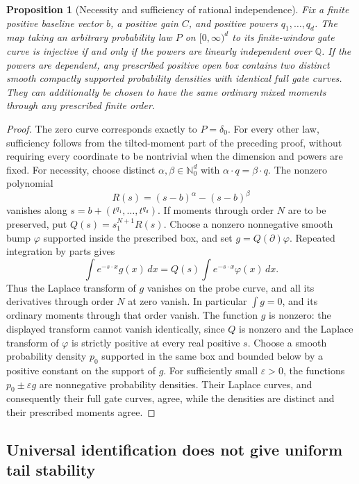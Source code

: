 \documentclass[11pt,letterpaper]{article}
\newtheorem{proposition}[theorem]{Proposition}
\theoremstyle{definition}
\theoremstyle{remark}
\newcommand{\1}{\mathbf 1}
\begin{document}
\begin{proposition}[Necessity and sufficiency of rational independence]
\label{p08:prop:temp-sharp-criterion}
Fix a finite positive baseline vector $b$, a positive gain $C$, and
positive powers $q_1,\ldots,q_d$. The map taking an arbitrary probability
law $P$ on $[0,\infty)^d$ to its finite-window gate curve is injective
if and only if the powers are linearly independent over $\mathbb Q$.
If the powers are dependent, any prescribed positive open box contains
two distinct smooth compactly supported probability densities with
identical full gate curves. They can additionally be chosen to have
the same ordinary mixed moments through any prescribed finite order.
\end{proposition}
\begin{proof}
The zero curve corresponds exactly to $P=\delta_0$. For every other
law, sufficiency follows from the tilted-moment part of the preceding
proof, without requiring every coordinate to be nontrivial when the
dimension and powers are fixed. For necessity, choose distinct
$\alpha,\beta\in\mathbb N_0^d$ with
$\alpha\cdot q=\beta\cdot q$. The nonzero polynomial
\[
            R(s)=(s-b)^\alpha-(s-b)^\beta
\]
vanishes along $s=b+(t^{q_1},\ldots,t^{q_d})$. If moments through
order $N$ are to be preserved, put $Q(s)=s_1^{N+1}R(s)$.
Choose a nonzero nonnegative smooth bump $\varphi$ supported inside
the prescribed box, and set $g=Q(\partial)\varphi$.
Repeated integration by parts gives
\[
          \int e^{-s\cdot x}g(x)\,dx
                 =Q(s)\int e^{-s\cdot x}\varphi(x)\,dx.
\]
Thus the Laplace transform of $g$ vanishes on the probe curve, and
all its derivatives through order $N$ at zero vanish. In particular
$\int g=0$, and its ordinary moments through that order vanish.
The function $g$ is nonzero: the displayed transform cannot vanish
identically, since $Q$ is nonzero and the Laplace transform of
$\varphi$ is strictly positive at every real positive $s$.
Choose a smooth probability density $p_0$ supported in the same box
and bounded below by a positive constant on the support of $g$.
For sufficiently small $\varepsilon>0$, the functions
$p_0\pm\varepsilon g$ are nonnegative probability densities. Their
Laplace curves, and consequently their full gate curves, agree, while
the densities are distinct and their prescribed moments agree.
\end{proof}

\subsection{Universal identification does not give uniform tail stability}
\end{document}

